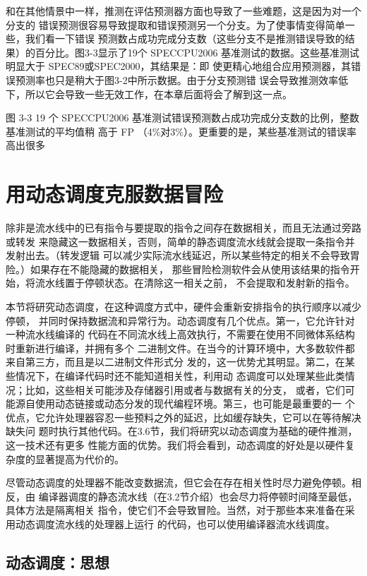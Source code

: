 和在其他情景中一样，推测在评估预测器方面也导致了一些难题，这是因为对一个分支的
错误预测很容易导致提取和错误预测另一个分支。为了使事情变得简单一些，我们看一下错误
预测数占成功完成分支数（这些分支不是推测错误导致的结果）的百分比。图3-3显示了19个
SPECCPU2006 基准测试的数据。这些基准测试明显大于 SPEC89或SPEC2000，其结果是：即
使更精心地组合应用预测器，其错误预测率也只是稍大于图3-2中所示数据。由于分支预测错
误会导致推测效率低下，所以它会导致一些无效工作，在本章后面将会了解到这一点。

图 3-3
19 个 SPECCPU2006 基准测试错误预测数占成功完成分支数的比例，整数基准测试的平均值稍
高于 FP （4\%对3\%）。更重要的是，某些基准测试的错误率高出很多

\section{用动态调度克服数据冒险}
除非是流水线中的已有指令与要提取的指令之间存在数据相关，而且无法通过旁路或转发
来隐藏这一数据相关，否则，简单的静态调度流水线就会提取一条指令并发射出去。（转发逻辑
可以减少实际流水线延迟，所以某些特定的相关不会导致胃险。）如果存在不能隐藏的数据相关，
那些冒险检测软件会从使用该结果的指令开始，将流水线置于停顿状态。在清除这一相关之前，
不会提取和发射新的指令。

本节将研究动态调度，在这种调度方式中，硬件会重新安排指令的执行顺序以减少停顿，
并同时保持数据流和异常行为。动态调度有几个优点。第一，它允许针对一种流水线编译的
代码在不同流水线上高效执行，不需要在使用不同微体系结构时重新进行编译，并拥有多个
二进制文件。在当今的计算环境中，大多数软件都来自第三方，而且是以二进制文件形式分
发的，这一优势尤其明显。第二，在某些情况下，在编译代码时还不能知道相关性，利用动
态调度可以处理某些此类情况；比如，这些相关可能涉及存储器引用或者与数据有关的分支，
或者，它们可能源自使用动态链接或动态分发的现代编程环境。第三，也可能是最重要的一
个优点，它允许处理器容忍一些预料之外的延迟，比如缓存缺失，它可以在等待解决缺失问
题时执行其他代码。在3.6节，我们将研究以动态调度为基础的硬件推测，这一技术还有更多
性能方面的优势。我们将会看到，动态调度的好处是以硬件复杂度的显著提高为代价的。

尽管动态调度的处理器不能改变数据流，但它会在存在相关性时尽力避免停顿。相反，由
编译器调度的静态流水线（在3.2节介绍）也会尽力将停顿时间降至最低，具体方法是隔离相关
指令，使它们不会导致冒险。当然，对于那些本来准备在采用动态调度流水线的处理器上运行
的代码，也可以使用编译器流水线调度。

\subsection{动态调度：思想}

